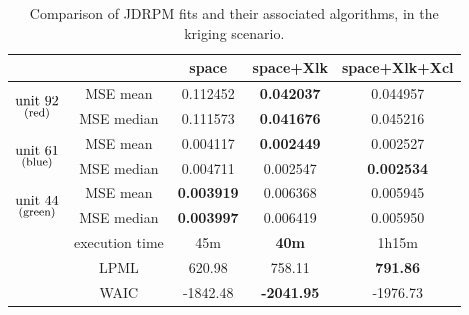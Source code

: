 \documentclass[12pt,	%
	a4paper,		%
	twoside,		%
	openright,		%
	titlepage,%
	]{book}
\theoremstyle{definition}
\begin{document}
\begin{table}[!ht]
\centering
\caption[Comparison of JDRPM fits, kriging scenario]{Comparison of JDRPM fits and their associated algorithms, in the kriging scenario.}
\begin{tabular}{ccccc}
\toprule
 & & space & space+Xlk & space+Xlk+Xcl \\
\midrule
\multirow{2}{*}{$ \underset{\text{\footnotesize (red)}}{\text{unit 92}}$} & MSE mean  & 0.112452 &  \textbf{0.042037}  & 0.044957 \\
                        & MSE median& 0.111573  & \textbf{0.041676}  & 0.045216  \\
\midrule
\multirow{2}{*}{$ \underset{\text{\footnotesize (blue)}}{\text{unit 61}}$} & MSE mean  & 0.004117  & \textbf{0.002449}  &  0.002527  \\
                        & MSE median& 0.004711  & 0.002547  & \textbf{0.002534} \\
\midrule
\multirow{2}{*}{$ \underset{\text{\footnotesize (green)}}{\text{unit 44}}$} & MSE mean  & \textbf{0.003919} & 0.006368  & 0.005945 \\
                        & MSE median& \textbf{0.003997} & 0.006419  & 0.005950  \\
\midrule
& execution time & 45m & \textbf{40m} & 1h15m \\
& LPML & 620.98 & 758.11 & \textbf{791.86}  \\
& WAIC & -1842.48 & \textbf{-2041.95} & -1976.73 \\
\bottomrule
\end{tabular}
\label{tab: kriging performances}
\end{table}
\end{document}
